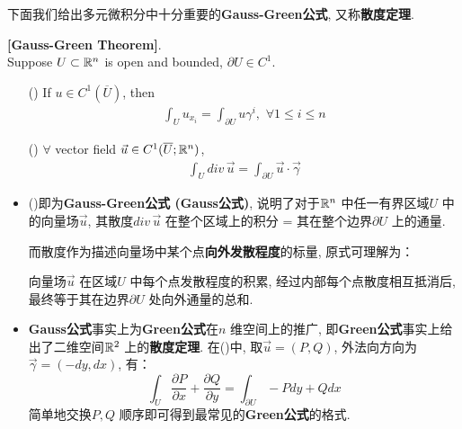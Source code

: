 	\vspace{6em}

	下面我们给出多元微积分中十分重要的\textbf{Gauss-Green公式}, 又称\textbf{散度定理}.

	\begin{thm}\label{thm B.4.1}
		\textbf{[Gauss-Green Theorem]}. \\
		Suppose $U \subset \mathbb{R}^n$ is open and bounded, $\partial U \in C^1$.
		\begin{enumerate}
			\item[(\rmnum{1})] If $u \in C^{1}(\overline{U})$, then
			\begin{align}
				\int_{U} u_{x_i} = \int_{\partial U} u \gamma^i , \,\, \forall 1 \leq i \leq n
			\end{align}
		
			\item[(\rmnum{2})] $\forall$ vector field $\vec{u} \in C^{1}(\overline{U} ; \mathbb{R}^n)$,
			\begin{align}
				\int_{U} div \, \vec{u} = \int_{\partial U} \vec{u} \cdot \vec{\gamma}
			\end{align}
		\end{enumerate}
	
		\vspace{2em}
	
		\begin{rmk}
			\begin{itemize}
				\item ()即为\textbf{Gauss-Green公式 (Gauss公式)}, 说明了对于$\mathbb{R}^n$ 中任一有界区域$U$ 	中的向量场$\vec{u}$, 其散度$div \, \vec{u}$ 在整个区域上的积分 = 其在整个边界$\partial U$ 上的通量.
			
				\vspace{1em}
			
				而散度作为描述向量场中某个点\textbf{向外发散程度}的标量, 原式可理解为：
				\begin{center}
					向量场$\vec{u}$ 在区域$U$ 中每个点发散程度的积累, 经过内部每个点散度相互抵消后, 最终等于其在边界$\partial 	U$ 处向外通量的总和.
				\end{center}
			
				\newpage
			
				\item \textbf{Gauss公式}事实上为\textbf{Green公式}在$n$ 维空间上的推广, 即\textbf{Green公式}事实上给出了二维空间$\mathbb{R}^2$ 上的\textbf{散度定理}. 在()中, 取$\vec{u} = (P , Q)$, 外法向方向为$\vec{\gamma} = (-dy , dx)$, 有：
				\[ \int_{U} \frac{\partial P}{\partial x} + \frac{\partial Q}{\partial y} 
				= \int_{\partial U} -P dy + Q dx \]
				简单地交换$P , Q$ 顺序即可得到最常见的\textbf{Green公式}的格式.
			

\end{itemize}
\end{rmk}
\end{thm}
